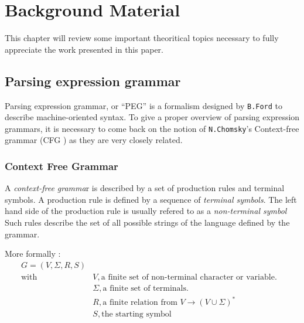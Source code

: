 \chapter{Background Material}
This chapter will review some important theoritical topics necessary to fully appreciate the work presented in this paper.

	\section{Parsing expression grammar} 
	Parsing expression grammar, or ``PEG'' is a formalism designed by \texttt{B.Ford} \cite{PEG} to describe machine-oriented syntax. To give a proper overview of parsing expression grammars, it is necessary to come back on the notion of \texttt{N.Chomsky}'s Context-free grammar (CFG \cite{CFG}) as they are very closely related. 

	\subsection{Context Free Grammar}

	A \textit{context-free gramma}r is described by a set of production rules and terminal symbols. A production rule is defined by a sequence of \textit{terminal symbols}. The left hand side of the production rule is usually refered to as a \textit{non-terminal symbol} Such rules describe the set of all possible strings of the language defined by the grammar.

	\bigskip
	
	\begin{tcolorbox}
	More formally :
	\begin{align*}
	G=(V,\Sigma, R,S)&&\\
		\mbox{with } 	&V, 	\mbox{a finite set of non-terminal character or variable.} 
	\\					&\Sigma, \mbox{a finite set of terminals.}
	\\					&R, \mbox{a finite relation from } V \rightarrow(V \cup \Sigma)^*
	\\					&S, \mbox{the starting symbol}
	\end{align*}
	\end{tcolorbox}

